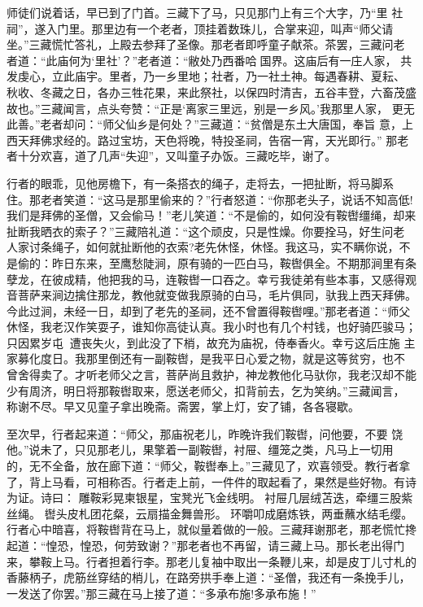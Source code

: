 师徒们说着话，早已到了门首。三藏下了马，只见那门上有三个大字，乃“里
社祠”，遂入门里。那里边有一个老者，顶挂着数珠儿，合掌来迎，叫声“师父请
坐。”三藏慌忙答礼，上殿去参拜了圣像。那老者即呼童子献茶。茶罢，三藏问老
者道：“此庙何为‘里社’？”老者道：“敝处乃西番哈国界。这庙后有一庄人家，
共发虔心，立此庙宇。里者，乃一乡里地；社者，乃一社土神。每遇春耕、夏耘、
秋收、冬藏之日，各办三牲花果，来此祭社，以保四时清吉，五谷丰登，六畜茂盛
故也。”三藏闻言，点头夸赞：“正是‘离家三里远，别是一乡风。’我那里人家，
更无此善。”老者却问：“师父仙乡是何处？”三藏道：“贫僧是东土大唐国，奉旨
意，上西天拜佛求经的。路过宝坊，天色将晚，特投圣祠，告宿一宵，天光即行。”
那老者十分欢喜，道了几声“失迎”，又叫童子办饭。三藏吃毕，谢了。

行者的眼乖，见他房檐下，有一条搭衣的绳子，走将去，一把扯断，将马脚系
住。那老者笑道：“这马是那里偷来的？”行者怒道：“你那老头子，说话不知高低!
我们是拜佛的圣僧，又会偷马！”老儿笑道：“不是偷的，如何没有鞍辔缰绳，却来
扯断我晒衣的索子？”三藏陪礼道：“这个顽皮，只是性燥。你要拴马，好生问老
人家讨条绳子，如何就扯断他的衣索?老先休怪，休怪。我这马，实不瞒你说，不
是偷的：昨日东来，至鹰愁陡涧，原有骑的一匹白马，鞍辔俱全。不期那涧里有条
孽龙，在彼成精，他把我的马，连鞍辔一口吞之。幸亏我徒弟有些本事，又感得观
音菩萨来涧边擒住那龙，教他就变做我原骑的白马，毛片俱同，驮我上西天拜佛。
今此过涧，未经一日，却到了老先的圣祠，还不曾置得鞍辔哩。”那老者道：“师父
休怪，我老汉作笑耍子，谁知你高徒认真。我小时也有几个村钱，也好骑匹骏马；
只因累岁屯，遭丧失火，到此没了下梢，故充为庙祝，侍奉香火。幸亏这后庄施
主家募化度日。我那里倒还有一副鞍辔，是我平日心爱之物，就是这等贫穷，也不
曾舍得卖了。才听老师父之言，菩萨尚且救护，神龙教他化马驮你，我老汉却不能
少有周济，明日将那鞍辔取来，愿送老师父，扣背前去，乞为笑纳。”三藏闻言，
称谢不尽。早又见童子拿出晚斋。斋罢，掌上灯，安了铺，各各寝歇。

至次早，行者起来道：“师父，那庙祝老儿，昨晚许我们鞍辔，问他要，不要
饶他。”说未了，只见那老儿，果擎着一副鞍辔，衬屉、缰笼之类，凡马上一切用
的，无不全备，放在廊下道：“师父，鞍辔奉上。”三藏见了，欢喜领受。教行者拿
了，背上马看，可相称否。行者走上前，一件件的取起看了，果然是些好物。有诗
为证。诗曰：
雕鞍彩晃柬银星，宝凳光飞金线明。
衬屉几层绒苫迭，牵缰三股紫丝绳。
辔头皮札团花粲，云扇描金舞兽形。
环嚼叩成磨炼铁，两垂蘸水结毛缨。
行者心中暗喜，将鞍辔背在马上，就似量着做的一般。三藏拜谢那老，那老慌忙搀
起道：“惶恐，惶恐，何劳致谢？”那老者也不再留，请三藏上马。那长老出得门
来，攀鞍上马。行者担着行李。那老儿复袖中取出一条鞭儿来，却是皮丁儿寸札的
香藤柄子，虎筋丝穿结的梢儿，在路旁拱手奉上道：“圣僧，我还有一条挽手儿，
一发送了你罢。”那三藏在马上接了道：“多承布施!多承布施！”


